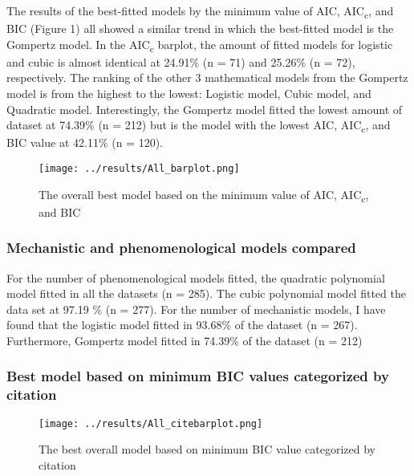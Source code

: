 \documentclass[11pt]{article}
\begin{document}
  The results of the best-fitted models by the minimum value of AIC, AIC\textsubscript{c}, and BIC (Figure 1) all showed a similar trend in which the best-fitted model is the Gompertz model.
  In the AIC\textsubscript{c} barplot, the amount of fitted models for logistic and cubic is almost identical at 24.91\% (n = 71) and 25.26\% (n = 72), respectively.
  The ranking of the other 3 mathematical models from the Gompertz model is from the highest to the lowest: Logistic model, Cubic model, and Quadratic model.
  Interestingly, the Gompertz model fitted the lowest amount of dataset at 74.39\% (n = 212) but is the model with the lowest AIC, AIC\textsubscript{c}, and BIC value at 42.11\% (n = 120).

  \begin{figure}[H]
    \begin{center}
      \captionsetup{justification=centering}
      \texttt{[image: ../results/All\_barplot.png]}
      \caption{The overall best model based on the minimum value of AIC, AIC\textsubscript{c}, and BIC }
    \end{center}
    \end{figure}

  \subsubsection*{Mechanistic and phenomenological models compared}

  For the number of phenomenological models fitted, the quadratic polynomial model fitted in all the datasets (n = 285).
  The cubic polynomial model fitted the data set at 97.19 \% (n = 277).
  For the number of mechanistic models, I have found that the logistic model fitted in 93.68\% of the dataset (n = 267).
  Furthermore, Gompertz model fitted in 74.39\% of the dataset (n = 212)

  \subsubsection*{Best model based on minimum BIC values categorized by citation}
  \begin{figure}[H]
    \begin{center}
      \captionsetup{justification=centering}
      \texttt{[image: ../results/All\_citebarplot.png]}
      \caption{The best overall model based on minimum BIC value categorized by citation}
    \end{center}
    \end{figure}
\end{document}
